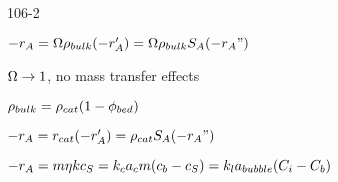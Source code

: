 \begin{mitframe}{106-2}
\begin{listone}
	\item $-\pos_{\helmholtz}=\mpc\dens_{bulk}(-\pos_{\helmholtz}')=\mpc\dens_{bulk}\entropy_{\helmholtz}(-\pos_{\helmholtz}")$
    	\begin{listtwo}
        	\item $\mpc\rightarrow{1}$, no mass transfer effects
            \item $\dens_{bulk}=\dens_{cat}(1-\eleccoeff_{bed})$
            \item $-\pos_{\helmholtz}=\pos_{cat}(-\pos_{\helmholtz}')=\dens_{cat}\entropy_{\helmholtz}(-\pos_{\helmholtz}")$
         \end{listtwo}
	\item $-\pos_{\helmholtz}=\mass\intrinsvisc\thermcond{c}_{\entropy}=\thermcond_c\activity_c\mass(c_b-c_{\entropy})=\thermcond_l\activity_{bubble}(\conc_{\state}-\conc_b)$
\end{listone}        
\end{mitframe}